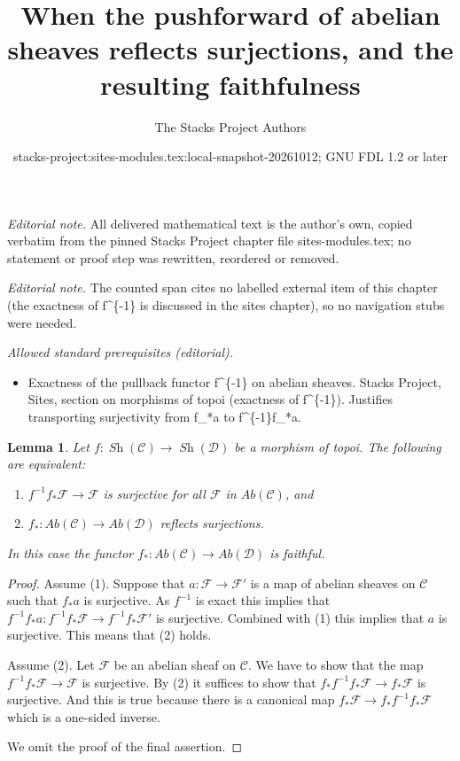\documentclass[10pt,a4paper]{amsart}
\title{When the pushforward of abelian sheaves reflects surjections, and the resulting faithfulness}
\author{The Stacks Project Authors}
\date{stacks-project:sites-modules.tex:local-snapshot-20261012; GNU FDL 1.2 or later}
\theoremstyle{plain}
\newtheorem{lemma}[subsection]{Lemma}
\theoremstyle{definition}
\theoremstyle{remark}
\numberwithin{equation}{subsection}
\def\Sh{\mathop{\mathit{Sh}}\nolimits}
\begin{document}
\maketitle
\noindent\textit{Editorial note.} All delivered mathematical text is the author's own, copied verbatim from the pinned Stacks Project chapter file sites-modules.tex; no statement or proof step was rewritten, reordered or removed.\par\medskip
\noindent\textit{Editorial note.} The counted span cites no labelled external item of this chapter (the exactness of f\textasciicircum{}\{-1\} is discussed in the sites chapter), so no navigation stubs were needed.\par\medskip
\noindent\textit{Allowed standard prerequisites (editorial).}\begin{itemize}
\item Exactness of the pullback functor f\textasciicircum{}\{-1\} on abelian sheaves. Stacks Project, Sites, section on morphisms of topoi (exactness of f\textasciicircum{}\{-1\}). Justifies transporting surjectivity from f\_*a to f\textasciicircum{}\{-1\}f\_*a.
\end{itemize}\medskip
\begin{lemma}
\label{lemma-reflect-surjections}
Let $f : \Sh(\mathcal{C}) \to \Sh(\mathcal{D})$ be
a morphism of topoi. The following are equivalent:
\begin{enumerate}
\item $f^{-1}f_*\mathcal{F} \to \mathcal{F}$ is surjective for
all $\mathcal{F}$ in $\textit{Ab}(\mathcal{C})$, and
\item $f_* : \textit{Ab}(\mathcal{C}) \to \textit{Ab}(\mathcal{D})$
reflects surjections.
\end{enumerate}
In this case the functor
$f_* : \textit{Ab}(\mathcal{C}) \to \textit{Ab}(\mathcal{D})$
is faithful.
\end{lemma}

\begin{proof}
Assume (1). Suppose that $a : \mathcal{F} \to \mathcal{F}'$
is a map of abelian sheaves on $\mathcal{C}$ such that $f_*a$ is surjective.
As $f^{-1}$ is exact this implies that
$f^{-1}f_*a : f^{-1}f_*\mathcal{F} \to f^{-1}f_*\mathcal{F}'$
is surjective. Combined with (1) this implies that $a$ is surjective.
This means that (2) holds.

\medskip\noindent
Assume (2). Let $\mathcal{F}$ be an abelian sheaf on $\mathcal{C}$.
We have to show that the map $f^{-1}f_*\mathcal{F} \to \mathcal{F}$ is
surjective. By (2) it suffices to show that
$f_*f^{-1}f_*\mathcal{F} \to f_*\mathcal{F}$ is surjective.
And this is true because there is a canonical map
$f_*\mathcal{F} \to f_*f^{-1}f_*\mathcal{F}$ which is a one-sided inverse.

\medskip\noindent
We omit the proof of the final assertion.
\end{proof}
\end{document}
